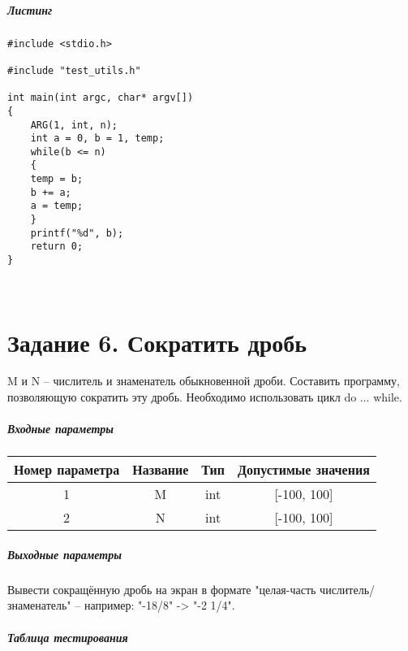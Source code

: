 \paragraph{Листинг}
\begin{lstlisting}
#include <stdio.h>

#include "test_utils.h"

int main(int argc, char* argv[])
{
	ARG(1, int, n);
	int a = 0, b = 1, temp;
	while(b <= n)
	{
	temp = b;
	b += a;
	a = temp;
	}
	printf("%d", b);
	return 0;
}

\end{lstlisting}
\\
\chapter*{Задание 6. Сократить дробь}

M и N – числитель и знаменатель обыкновенной дроби. Составить программу, позволяющую сократить эту дробь.
Необходимо использовать цикл do ... while.

\paragraph{Входные параметры}

\begin{tabular}{ |c|c|c|c| }
\hline
Номер параметра & Название & Тип & Допустимые значения \\ 
 \hline
1 & M & int & [-100, 100] \\ 
 \hline
2 & N & int & [-100, 100] \\ 
 \hline

\end{tabular}


\paragraph{Выходные параметры}

Вывести сокращённую дробь на экран в формате "целая-часть числитель/знаменатель" -- например: "-18/8" -> "-2 1/4".

\paragraph{Таблица тестирования}

